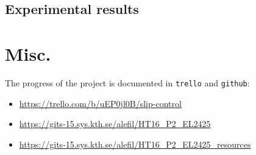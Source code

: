 \documentclass[a4paper,12pt,oneside,onecolumn]{article} %
\begin{document}
    \subsection{Experimental results}
      



\section{Misc.}

The progress of the project is documented in \texttt{trello} and \texttt{github}:

\begin{itemize}
  \item \url{https://trello.com/b/uEP0jl0B/slip-control}
  \item \url{https://gits-15.sys.kth.se/alefil/HT16_P2_EL2425}
  \item \url{https://gits-15.sys.kth.se/alefil/HT16_P2_EL2425_resources}
\end{itemize}
\end{document}
